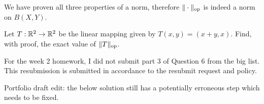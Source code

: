 \documentclass{article}
\begin{document}
\begin{soln}
    We have proven all three properties of a norm, therefore $ \|\cdot\|_{\textrm{op}} $
    is indeed a norm on $ B(X, Y) $.
\end{soln}

\begin{qu}
    Let $ T: \mathbb{R}^{2} \rightarrow \mathbb{R}^{2} $ be the linear mapping given by
    $ T(x, y) = (x + y, x) $. Find, with proof, the exact value of $ \|T\|_{\textrm{op}} $.
\end{qu}

For the week 2 homework, I did not submit part 3 of Question 6 from the big list.
This resubmission is submitted in accordance to the resubmit request and policy.

Portfolio draft edit: the below solution still has a potentially erroneous step which needs to be
fixed.
\end{document}
